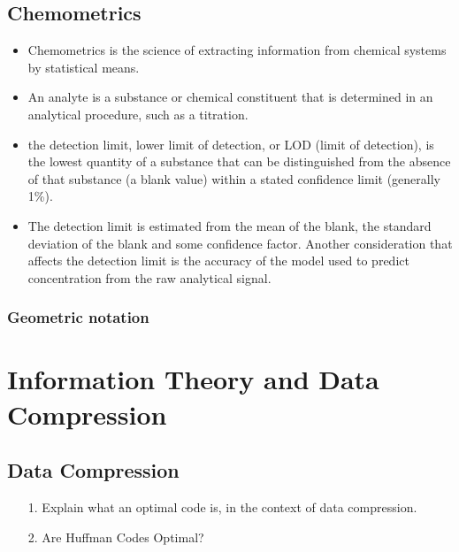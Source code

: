 \section{Chemometrics}
\begin{itemize}
	\item  Chemometrics is the science of extracting information from chemical systems by statistical means.
	\item An analyte is a substance or chemical constituent that is determined in an analytical procedure, such as a titration.
	\item the detection limit, lower limit of detection, or LOD (limit of detection), is the lowest quantity of a substance that can be distinguished from the absence of that substance (a blank value) within a stated confidence limit (generally 1\%).
	\item The detection limit is estimated from the mean of the blank, the standard deviation of the blank and some confidence factor. Another consideration that affects the detection limit is the accuracy of the model used to predict concentration from the raw analytical signal.
	
\end{itemize}

\subsection{Geometric notation}








\newpage



\newpage



\chapter{ Information Theory and Data Compression}

\section{Data Compression}
\begin{itemize}
	\item[1.] Explain what an optimal code is, in the context of data compression.
	\item[2.] Are Huffman Codes Optimal?
\end{itemize}


